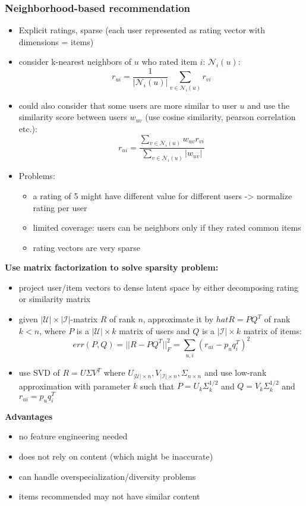 \subsubsection{Neighborhood-based recommendation}
\begin{itemize}
    \item Explicit ratings, sparse (each user represented as rating vector with dimensions = items)
    \item consider k-nearest neighbors of $u$ who rated item $i$: $\mathcal{N}_i(u)$:
    $$r_{ui} = \dfrac{1}{|\mathcal{N}_i(u)|} \sum_{v \in \mathcal{N}_i(u)}r_{vi}$$
    \item could also consider that some users are more similar to user $u$ and use the similarity score between users $w_{uv}$ (use cosine similarity, pearson correlation etc.):
    $$ r_{ui} = \dfrac{\sum_{v \in \mathcal{N}_i(u)}w_{uv}r_{vi}}{\sum_{v \in \mathcal{N}_i(u)} |w_{uv}|}$$
    \item Problems:
    \begin{itemize}
        \item a rating of 5 might have different value for different users -> normalize rating per user
        \item limited coverage: users can be neighbors only if they rated common items
        \item rating vectors are very sparse
    \end{itemize}
\end{itemize}
\textbf{Use matrix factorization to solve sparsity problem:}
\begin{itemize}
    \item project user/item vectors to dense latent space by either decomposing rating or similarity matrix
    \item given $|\mathcal{U}| \times |\mathcal{I}|$-matrix $R$ of rank $n$, approximate it by $hat{R}=PQ^T$ of rank $k<n$, where $P$ is a $|\mathcal{U}| \times k$ matrix of users and $Q$ is a $|\mathcal{I}| \times k$ matrix of items:
    $$ err(P,Q) = ||R - PQ^T||^2_F = \sum_{u,i} (r_{ui} - p_uq_i^T)^2 $$
    \item use SVD of $R = U \Sigma V^T$ where $U_{|\mathcal{U}| \times n}, V_{|\mathcal{I}| \times n}, \Sigma_{n \times n}$ and use low-rank approximation with parameter $k$ such that $P = U_k \Sigma_k^{1/2}$ and $Q = V_k \Sigma_k^{1/2}$ and $r_{ui} = p_u q_i^T$
\end{itemize}
\textbf{Advantages}
\begin{itemize}
    \item no feature engineering needed
    \item does not rely on content (which might be inaccurate)
    \item can handle overspecialization/diversity problems
    \item items recommended may not have similar content
\end{itemize}
